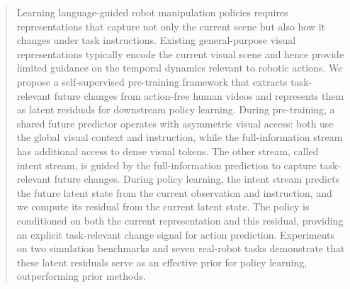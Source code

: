 \begin{abstract}
Learning language-guided robot manipulation policies requires representations that capture not only the current scene but also how it changes under task instructions. Existing general-purpose visual representations typically encode the current visual scene and hence provide limited guidance on the temporal dynamics relevant to robotic actions. We propose a self-supervised pre-training framework that extracts task-relevant future changes from action-free human videos and represents them as latent residuals for downstream policy learning. During pre-training, a shared future predictor operates with asymmetric visual access: both use the global visual context and instruction, while the full-information stream has additional access to dense visual tokens. The other stream, called intent stream, is guided by the full-information prediction to capture task-relevant future changes. During policy learning, the intent stream predicts the future latent state from the current observation and instruction, and we compute its residual from the current latent state. The policy is conditioned on both the current representation and this residual, providing an explicit task-relevant change signal for action prediction. Experiments on two simulation benchmarks and seven real-robot tasks demonstrate that these latent residuals serve as an effective prior for policy learning, outperforming prior methods.
\end{abstract}
